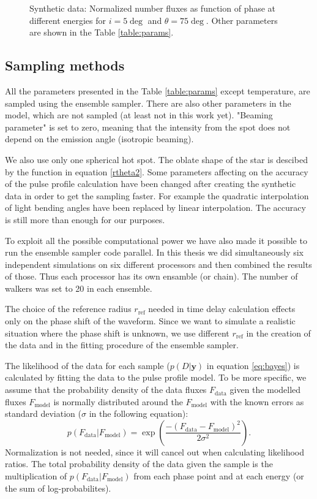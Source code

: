 \documentclass{wihuri}
\def\be{\begin{equation}}
\def\ee{\end{equation}}
\begin{document}
\begin{figure}
\centerline{}
\caption{Synthetic data: Normalized number fluxes as function of phase at different energies for $i = 5 \deg$ and $\theta = 75 \deg$. Other parameters are shown in the Table \ref{table:params}.
\label{fig:synteq2}}
\end{figure}


\subsection{Sampling methods}

All the parameters presented in the Table \ref{table:params} except temperature, are sampled using the ensemble sampler. There are also other parameters in the model, which are not sampled (at least not in this work yet). "Beaming parameter" is set to zero, meaning that the intensity from the spot does not depend on the emission angle (isotropic beaming). 

We also use only one spherical hot spot. The oblate shape of the star is descibed by the function in equation \ref{rtheta2}. Some parameters affecting on the accuracy of the pulse profile calculation have been changed after creating the synthetic data in order to get the sampling faster. For example the quadratic interpolation of light bending angles have been replaced by linear interpolation. The accuracy is still more than enough for our purposes. 

To exploit all the possible computational power we have also made it possible to run the ensemble sampler code parallel. In this thesis we did simultaneously six independent simulations on six different processors and then combined the results of those. Thus each processor has its own ensamble (or chain). The number of walkers was set to 20 in each ensemble. 
 

The choice of the reference radius $r_{\mathrm{ref}}$ needed in time delay calculation effects only on the phase shift of the waveform. Since we want to simulate a realistic situation where the phase shift is unknown, we use different $r_{\mathrm{ref}}$ in the creation of the data and in the fitting procedure of the ensemble sampler.  

The likelihood of the data for each sample ($p(D|\textbf{y})$ in equation \ref{eq:bayes}) is calculated by fitting the data to the pulse profile model. To be more specific, we assume that the probability density of the data fluxes $F_{\mathrm{data}}$ given the modelled fluxes $F_{\mathrm{model}}$  is normally distributed around the $F_{\mathrm{model}}$ with the known errors as standard deviation ($\sigma$ in the following equation): 
\be \label{eq:gaussprob}
p(F_{\mathrm{data}}|F_{\mathrm{model}}) = \exp (\frac{-(F_{\mathrm{data}}-F_{\mathrm{model}})^{2}}{2\sigma^{2}}).
\ee
Normalization is not needed, since it will cancel out when calculating likelihood ratios. The total probability density of the data given the sample is the multiplication of $p(F_{\mathrm{data}}|F_{\mathrm{model}})$ from each phase point and at each energy (or the sum of log-probabilites). 
\end{document}

